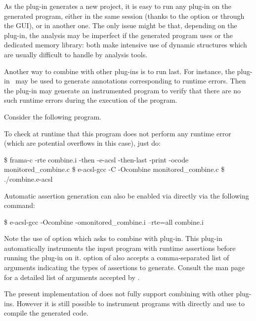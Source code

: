 As the \eacsl plug-in generates a new \framac project, it is easy to run any
plug-in on the generated program, either in the same \framac session (thanks to
the option  or through the GUI), or in another one. The only
issue might be that, depending on the plug-in, the analysis may be imperfect if
the generated program uses \gmp or the dedicated memory library: both make
intensive use of dynamic structures which are usually difficult to handle by
analysis tools.

Another way to combine \eacsl with other plug-ins is to run \eacsl last.  For
instance, the \rte plug-in~\cite{rte} may be used to generate annotations
corresponding to runtime errors. Then the \eacsl plug-in may generate an
instrumented program to verify that there are no such runtime errors during the
execution of the program.

Consider the following program.

To check at runtime that this program does not perform any runtime error (which
are potential overflows in this case), just do:

\begin{frama-c-commands}
\$ frama-c -rte combine.i -then -e-acsl -then-last -print
  -ocode monitored_combine.c
\$ e-acsl-gcc -C -Ocombine monitored_combine.c
\$ ./combine.e-acsl
\end{frama-c-commands}

Automatic assertion generation can also be enabled via \eacslgcc directly via
the following command:
\begin{frama-c-commands}
\$ e-acsl-gcc -Ocombine -omonitored_combine.i --rte=all combine.i
\end{frama-c-commands}

Note the use of \eacslgcc {} option which asks \framac to combine
\eacsl with \rte plug-in. This plug-in automatically instruments the input
program with runtime
assertions before running the \eacsl plug-in on it.   option of
\eacslgcc also accepts a comma-separated list of arguments indicating the types
of assertions to generate. Consult the \eacslgcc man page for a detailed
list of arguments accepted by .

The present implementation of \eacslgcc does not fully support combining \eacsl
with other \framac plug-ins. However it is still possible to instrument programs
with \eacsl directly and use \eacslgcc to compile the generated code.

